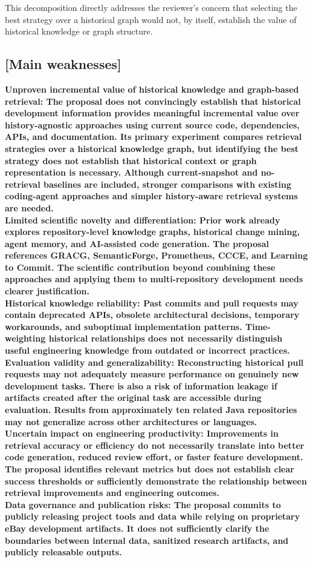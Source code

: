\documentclass[11pt]{article}
\begin{document}
This decomposition directly addresses the reviewer’s concern that selecting the best strategy over a historical graph would not, by itself, establish the value of historical knowledge or graph structure.



\subsection*{[Main weaknesses]}

\textbf{Unproven incremental value of historical knowledge and graph-based retrieval: The proposal does not convincingly establish that historical development information provides meaningful incremental value over history-agnostic approaches using current source code, dependencies, APIs, and documentation. Its primary experiment compares retrieval strategies over a historical knowledge graph, but identifying the best strategy does not establish that historical context or graph representation is necessary. Although current-snapshot and no-retrieval baselines are included, stronger comparisons with existing coding-agent approaches and simpler history-aware retrieval systems are needed.\\
Limited scientific novelty and differentiation: Prior work already explores repository-level knowledge graphs, historical change mining, agent memory, and AI-assisted code generation. The proposal references GRACG, SemanticForge, Prometheus, CCCE, and Learning to Commit. The scientific contribution beyond combining these approaches and applying them to multi-repository development needs clearer justification.\\
Historical knowledge reliability: Past commits and pull requests may contain deprecated APIs, obsolete architectural decisions, temporary workarounds, and suboptimal implementation patterns. Time-weighting historical relationships does not necessarily distinguish useful engineering knowledge from outdated or incorrect practices.\\
Evaluation validity and generalizability: Reconstructing historical pull requests may not adequately measure performance on genuinely new development tasks. There is also a risk of information leakage if artifacts created after the original task are accessible during evaluation. Results from approximately ten related Java repositories may not generalize across other architectures or languages.\\
Uncertain impact on engineering productivity: Improvements in retrieval accuracy or efficiency do not necessarily translate into better code generation, reduced review effort, or faster feature development. The proposal identifies relevant metrics but does not establish clear success thresholds or sufficiently demonstrate the relationship between retrieval improvements and engineering outcomes.\\
Data governance and publication risks: The proposal commits to publicly releasing project tools and data while relying on proprietary eBay development artifacts. It does not sufficiently clarify the boundaries between internal data, sanitized research artifacts, and publicly releasable outputs.}
\end{document}
